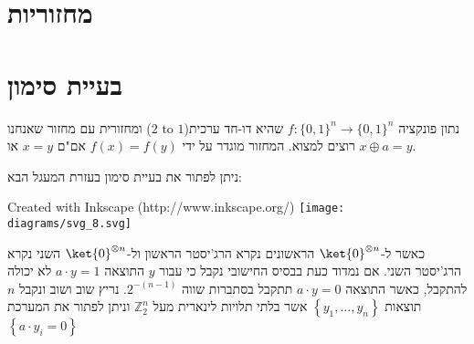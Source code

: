 \documentclass{tstextbook}
\begin{document}
\section{מחזוריות}

\section{בעיית סימון}

\begin{definition}
נתון פונקציה \(f:\{ 0,1 \}^{n}\to \{ 0,1 \}^{n}\) שהיא דו-חד ערכית(\(\text{2 to 1}\)) ומחזורית עם מחזור שאנחנו רוצים למצוא. המחזור מוגדר על ידי \(f(x)=f(y)\) אם"ם \(x=y\) או \(x\oplus a =y\).

\end{definition}
\begin{proposition}
ניתן לפתור את בעיית סימון בעזרת המעגל הבא:

 Created with Inkscape (http://www.inkscape.org/) \texttt{[image: diagrams/svg\_8.svg]}
\end{proposition}
כאשר ל-\(\ket{0}^{\otimes n}\) הראשונים נקרא הרג'יסטר הראשון ול-\(\ket{0}^{\otimes n}\) השני נקרא הרג'יסטר השני. אם נמדוד כעת בבסיס החישובי נקבל כי עבור \(y\) התוצאה \(a\cdot y = 1\) לא יכולה להתקבל, כאשר התוצאה \(a\cdot y = 0\) תתקבל בסתברות שווה \(2^{-(n-1)}\). נריץ שוב ושוב ונקבל \(n\) תוצאות \(\left\{  y_{1},\dots,y_{n}  \right\}\)  אשר בלתי תלויות לינארית מעל \(\mathbb{Z}_{2}^{n}\) וניתן לפתור את המערכת \(\left\{  a\cdot y_{i}=0  \right\}\)
\end{document}
